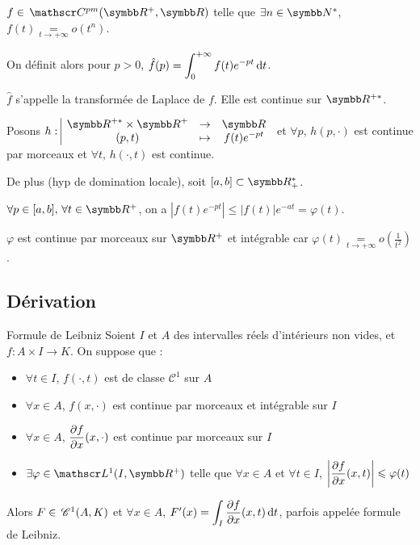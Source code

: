 \begin{exemple}
    $f \in \mc{pm}(\R^+, \R)$ telle que $\exists n \in \N^*$, $f(t) \underset{t \to + \infty}{=} o(t^n)$.

    On définit alors pour $p > 0$, $\hat f(p) \displaystyle = \int_0^{+ \infty} f(t) e^{-pt} \,\mathrm{d}t$.

    $\hat f$ s'appelle la transformée de Laplace de $f$. Elle est continue sur $\R^{+*}$.

    Posons $\fonction h {\R^{+*} \times \R^+}\R{(p, t)}{f(t) e^{-pt}}$ et 
    $\forall p, \, h(p, \cdot)$ est continue par morceaux et $\forall t, \, h(\cdot, t)$ est continue. 

    De plus (hyp de domination locale), soit $[a, b] \subset \R^*_+$. 

    $\forall p \in [a, b], \, \forall t \in \R^+$, on a $|f(t) e^{-pt}| \leqslant |f(t)|e^{-at} = \varphi(t)$. 

    $\varphi$ est continue par morceaux sur $\R^+$ et intégrable car 
    $\varphi(t) \underset{t \to + \infty}{=} o\left( \frac 1 {t^2} \right)$.
\end{exemple}

\subsection{Dérivation }

\begin{theoreme}{Formule de Leibniz}{}
    Soient $I$ et $A$ des intervalles réels d'intérieurs non vides, et $f : A \times I \to K$. 
    On suppose que :
    \begin{itemize}
        \item $\forall t \in I$, $f(\cdot, t)$ est de classe $\mathscr C^1$ sur $A$
        \item $\forall x \in A$, $f(x, \cdot)$ est continue par morceaux et intégrable sur $I$
        \item $\forall x \in A$, $\displaystyle \frac{\partial f}{\partial x} (x, \cdot)$ est continue par morceaux sur $I$
        \item $\exists \varphi \in \mathscr L^1(I, \R^+)$ telle que $\forall x \in A$ et $\forall t \in I$, $\displaystyle \left|\frac{\partial f}{\partial x} (x, t) \right| \leqslant \varphi(t)$
    \end{itemize}

    Alors $F \in \,\mathscr C^{1} (A, K)$ et $\forall x \in A$, $F'(x) = \displaystyle \int_I \frac{\partial f}{\partial x} (x, t) \,\mathrm{d}t$, parfois appelée 
    formule de Leibniz.
\end{theoreme}

